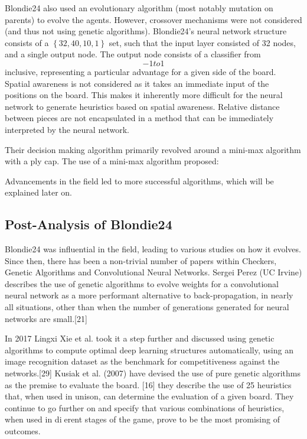 \documentclass[12pt,a4paper]{article}
\begin{document}
        Blondie24 also used an evolutionary algorithm (most notably mutation on parents) to evolve the agents. However, crossover mechanisms were not considered (and thus not using genetic algorithms). Blondie24's neural network structure consists of a $\left\{ 32,40,10,1 \right\}$ set, such that the input layer consisted of 32 nodes, and a single output node. The output node consists of a classifier from \[-1 to 1\] inclusive, representing a particular advantage for a given side of the board. Spatial awareness is not considered as it takes an immediate input of the positions on the board. This makes it inherently more difficult for the neural network to generate heuristics based on spatial awareness. Relative distance between pieces are not encapsulated in a method that can be immediately interpreted by the neural network.

        Their decision making algorithm primarily revolved around a mini-max algorithm with a ply cap. The use of a mini-max algorithm proposed:

        Advancements in the field led to more successful algorithms, which will be explained later on. 

    
    \subsection{Post-Analysis of Blondie24}
        Blondie24 was influential in the field, leading to various studies on how it evolves.
        Since then, there has been a non-trivial number of papers within Checkers,
        Genetic Algorithms and Convolutional Neural Networks. Sergei Perez (UC Irvine) describes the use of genetic algorithms to evolve weights for a convolutional neural network as a more performant alternative to back-propagation, in nearly all situations, other than when the number of generations generated for neural networks are small.[21]

        In 2017 Lingxi Xie et al. took it a step further and discussed using genetic algorithms to compute optimal deep learning structures automatically, using an image recognition dataset as the benchmark for competitiveness against the networks.[29] Kusiak et al. (2007) have devised the use of pure genetic algorithms as the premise to evaluate the board. [16] they describe the use of 25 heuristics that, when used in unison, can determine the evaluation of a given board. They continue to go further on and specify that various combinations of heuristics, when used in dierent stages of the game, prove to be the most promising of outcomes.
        
\end{document}
